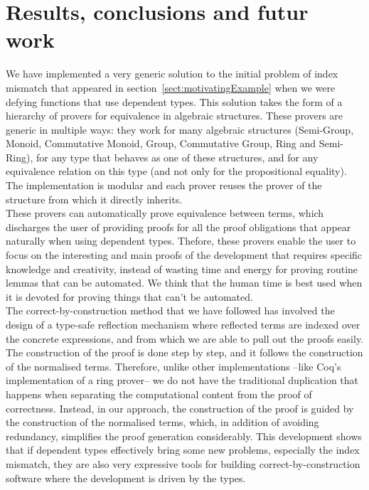 \section{Results, conclusions and futur work}

We have implemented a very generic solution to the initial problem of index mismatch that appeared in section~\ref{sect:motivatingExample} when we were defying functions that use dependent types. This solution takes the form of a hierarchy of provers for equivalence in algebraic structures. These provers are generic in multiple ways: they work for many algebraic structures (Semi-Group, Monoid, Commutative Monoid, Group, Commutative Group, Ring and Semi-Ring), for any type that behaves as one of these structures, and for any equivalence relation on this type (and not only for the propositional equality). The implementation is modular and each prover reuses the prover of the structure from which it directly inherits. \\

These provers can automatically prove equivalence between terms, which discharges the user of providing proofs for all the proof obligations that appear naturally when using dependent types. Thefore, these provers enable the user to focus on the interesting and main proofs of the development that requires specific knowledge and creativity, instead of wasting time and energy for proving routine lemmas that can be automated. We think that the human time is best used when it is devoted for proving things that can't be automated. \\

The correct-by-construction method that we have followed has involved the design of a type-safe reflection mechanism where reflected terms are indexed over the concrete expressions, and from which we are able to pull out the proofs easily. The construction of the proof is done step by step, and it follows the construction of the normalised terms. Therefore, unlike other implementations --like Coq's implementation of a ring prover-- we do not have the traditional duplication that happens when separating the computational content from the proof of correctness. Instead, in our approach, the construction of the proof is guided by the construction of the normalised terms, which, in addition of avoiding redundancy, simplifies the proof generation considerably. This development shows that if dependent types effectively bring some new problems, especially the index mismatch, they are also very expressive tools for building correct-by-construction software where the development is driven by the types. \\

